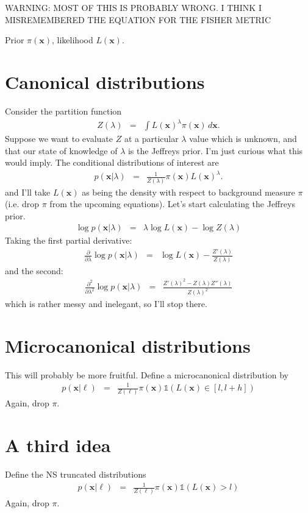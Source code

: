 \documentclass[a4paper, 11pt]{article}
\title{}
\author{}
\newcommand{\xx}{\boldsymbol{x}}	%
\begin{document}
\maketitle

WARNING: MOST OF THIS IS PROBABLY WRONG. I THINK I MISREMEMBERED THE
EQUATION FOR THE FISHER METRIC

Prior $\pi(\xx)$, likelihood $L(\xx)$.

\section{Canonical distributions}
Consider the partition function
\begin{eqnarray}
Z(\lambda) &=& \int L(\xx)^\lambda \pi(\xx) \, d\xx.
\end{eqnarray}
Suppose we want to evaluate $Z$ at a particular $\lambda$ value which is
unknown, and that our state of knowledge of $\lambda$ is the Jeffreys prior.
I'm just curious what this would imply. The conditional distributions of
interest are
\begin{eqnarray}
p(\xx | \lambda) &=& \frac{1}{Z(\lambda)}\pi(\xx)L(\xx)^\lambda.
\end{eqnarray}
and I'll take $L(\xx)$ as being the density with respect to background measure
$\pi$ (i.e. drop $\pi$ from the upcoming equations).
Let's start calculating the Jeffreys prior.
\begin{eqnarray}
\log p(\xx | \lambda) &=&  \lambda \log L(\xx) - \log Z(\lambda)
\end{eqnarray}
Taking the first partial derivative:
\begin{eqnarray}
\frac{\partial}{\partial \lambda}
\log p(\xx | \lambda) &=& \log L(\xx) - \frac{Z'(\lambda)}{Z(\lambda)}
\end{eqnarray}
and the second:
\begin{eqnarray}
\frac{\partial^2}{\partial \lambda^2}
\log p(\xx | \lambda) &=& \frac{Z'(\lambda)^2 - Z(\lambda)Z''(\lambda)}{Z(\lambda)^2}
\end{eqnarray}
which is rather messy and inelegant, so I'll stop there.

\section{Microcanonical distributions}
This will probably be more fruitful. Define a microcanonical distribution by
\begin{eqnarray}
p(\xx | \ell) &=& \frac{1}{Z(\ell)}\pi(\xx)\mathds{1}
\left(L(\xx) \in [l, l + h]\right)
\end{eqnarray}
Again, drop $\pi$. 


\section{A third idea}
Define the NS truncated distributions
\begin{eqnarray}
p(\xx | \ell) &=& \frac{1}{Z(\ell)}\pi(\xx)\mathds{1}
\left(L(\xx) > l\right)
\end{eqnarray}
Again, drop $\pi$. 
\end{document}
